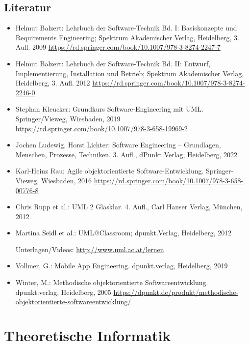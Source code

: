 \hypertarget{literaturpathlabel....srcmodulbeschreibungen-bachelor-bpo5ba_softwaretechnik}{%
\section*{Literatur\label{../../src/modulbeschreibungen-bachelor-bpo5/BA_Softwaretechnik}}\label{literaturpathlabel....srcmodulbeschreibungen-bachelor-bpo5ba_softwaretechnik}}

\begin{itemize}
\tightlist
\item
  Helmut Balzert: Lehrbuch der Software-Technik Bd. I: Basiskonzepte und
  Requirements Engineering; Spektrum Akademischer Verlag, Heidelberg, 3.
  Aufl. 2009
  \url{https://rd.springer.com/book/10.1007/978-3-8274-2247-7}
\item
  Helmut Balzert: Lehrbuch der Software-Technik Bd. II: Entwurf,
  Implementierung, Installation und Betrieb; Spektrum Akademischer
  Verlag, Heidelberg, 3. Aufl. 2012
  \url{https://rd.springer.com/book/10.1007/978-3-8274-2246-0}
\item
  Stephan Kleucker: Grundkurs Software-Engineering mit UML.
  Springer/Vieweg, Wiesbaden, 2019
  \url{https://rd.springer.com/book/10.1007/978-3-658-19969-2}
\item
  Jochen Ludewig, Horst Lichter: Software Engineering -- Grundlagen,
  Menschen, Prozesse, Techniken. 3. Aufl., dPunkt Verlag, Heidelberg,
  2022
\item
  Karl-Heinz Rau: Agile objektorientierte Software-Entwicklung.
  Springer-Vieweg, Wiesbaden, 2016
  \url{https://rd.springer.com/book/10.1007/978-3-658-00776-8}
\item
  Chris Rupp et al.: UML 2 Glasklar. 4. Aufl., Carl Hanser Verlag,
  München, 2012
\item
  Martina Seidl et al.: UML@Classroom; dpunkt.Verlag, Heidelberg, 2012

  Unterlagen/Videos: \url{http://www.uml.ac.at/lernen}
\item
  Vollmer, G.: Mobile App Engineering. dpunkt.verlag, Heidelberg, 2019
\item
  Winter, M.: Methodische objektorientierte Softwareentwicklung.
  dpunkt.verlag, Heidelberg, 2005
  \url{https://dpunkt.de/produkt/methodische-objektorientierte-softwareentwicklung/}
\end{itemize}

\hypertarget{theoretische-informatikpathlabel....srcmodulbeschreibungen-bachelor-bpo5ba_theoretischeinformatik}{%
\chapter{Theoretische
Informatik\label{../../src/modulbeschreibungen-bachelor-bpo5/BA_TheoretischeInformatik}}\label{theoretische-informatikpathlabel....srcmodulbeschreibungen-bachelor-bpo5ba_theoretischeinformatik}}

